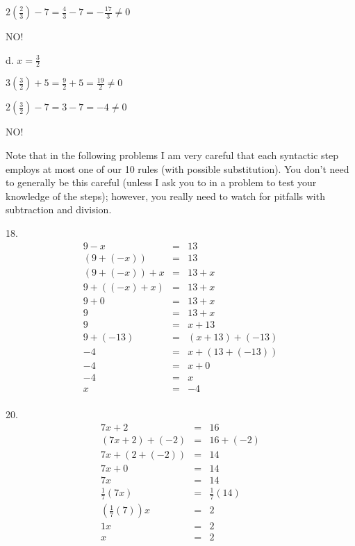\documentclass[letterpaper]{article}
\begin{document}
$2(\frac{2}{3}) - 7 = \frac{4}{3} - 7 = -\frac{17}{3} \ne 0$

NO!

\bigskip

d. $x = \frac{3}{2}$

\bigskip

$3(\frac{3}{2}) + 5 = \frac{9}{2} + 5 = \frac{19}{2} \ne 0$

$2(\frac{3}{2}) - 7 = 3 - 7 = -4 \ne 0$

NO!

\bigskip

Note that in the following problems I am very careful that each syntactic
step employs at most one of our 10 rules (with possible substitution).  You
don't need to generally be this careful (unless I ask you to in a problem to
test your knowledge of the steps); however, you really need to watch for
pitfalls with subtraction and division.

\bigskip

18.
\begin{eqnarray*}
9 - x &=& 13 \\
(9 + (-x)) &=& 13 \\
(9 + (-x)) + x &=& 13 + x \\
9 + ((-x) + x) &=& 13 + x \\
9 + 0 &=& 13 + x \\
9 &=& 13 + x \\
9 &=& x + 13 \\
9 + (-13) &=& (x + 13) + (-13) \\
-4 &=& x + (13 + (-13)) \\
-4 &=& x + 0 \\
-4 &=& x \\
x &=& -4 \\
\end{eqnarray*}

20.
\begin{eqnarray*}
7x+2 &=& 16 \\
(7x+2)+(-2) &=& 16+(-2) \\
7x+(2+(-2)) &=& 14 \\
7x+0 &=& 14 \\
7x &=& 14 \\
\frac{1}{7}(7x) &=& \frac{1}{7}(14) \\
(\frac{1}{7}(7))x &=& 2 \\
1x &=& 2 \\
x &=& 2 \\
\end{eqnarray*}
\end{document}

